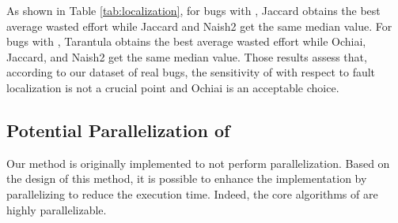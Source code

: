 As shown in Table \ref{tab:localization}, for bugs with \buggyconditions, Jaccard obtains the best average wasted effort while Jaccard and Naish2 get the same median value. For bugs with \preconditions, Tarantula obtains the best average wasted effort while Ochiai, Jaccard, and Naish2 get the same median value. 
Those results assess that, according to our dataset of real bugs, the sensitivity of \nopol with respect to fault localization is not a crucial point and Ochiai is an acceptable choice.

\subsection{Potential Parallelization of \nopol}
\label{subsect:parallelization}

Our method \nopol is originally implemented to not perform parallelization. Based on the design of this method, it is possible to enhance the implementation by parallelizing \nopol to reduce the execution time. 
Indeed, the core algorithms of \nopol are highly parallelizable. 

\begin{table}[!t]
\centering
\caption{Wasted effort comparison among six fault localization techniques.}
\label{tab:localization}
\setlength\tabcolsep{0.4 ex}
\end{table}

